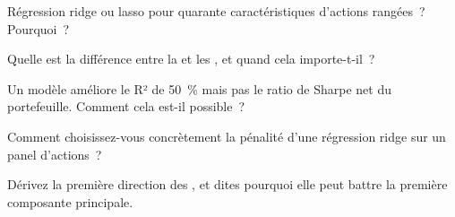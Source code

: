 \begin{interviewq}\label{iq:ml:linear-and-regularised-baselines:2}
Régression ridge ou lasso pour quarante caractéristiques d'actions rangées~? Pourquoi~?
\end{interviewq}

\begin{interviewq}\label{iq:ml:linear-and-regularised-baselines:3}
Quelle est la différence entre la  et les , et quand cela importe-t-il~?
\end{interviewq}

\begin{interviewq}\label{iq:ml:linear-and-regularised-baselines:4}
Un modèle améliore le R² de 50~\% mais pas le ratio de Sharpe net du portefeuille. Comment cela est-il possible~?
\end{interviewq}

\begin{interviewq}\label{iq:ml:linear-and-regularised-baselines:5}
Comment choisissez-vous concrètement la pénalité d'une régression ridge sur un panel d'actions~?
\end{interviewq}

\begin{interviewq}\label{iq:ml:linear-and-regularised-baselines:6}
Dérivez la première direction des , et dites pourquoi elle peut battre la première composante principale.
\end{interviewq}
